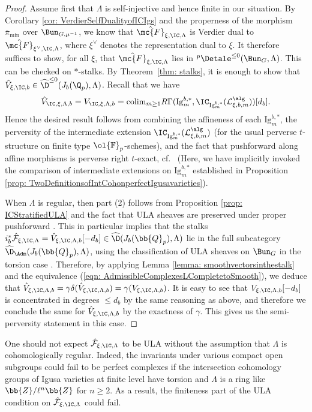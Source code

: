 \documentclass[letterpaper,11pt]{amsart}
\begin{document}
\begin{proof}
Assume first that $\Lambda$ is self-injective and hence finite in our situation. By Corollary \ref{cor: VerdierSelfDualityofICIgs} and the properness of the morphism $\overline{\pi}_{\min}$ over $\Bun_{G,\mu^{-1}}$, we know that $\hat{\mc{F}}_{\xi,\IC,\Lambda}$ is Verdier dual to $\hat{\mc{F}}_{\xi^{\vee},\IC,\Lambda}$, where $\xi^{\vee}$ denotes the representation dual to $\xi$.  It therefore suffices to show, for all $\xi$, that $\hat{\mc{F}}_{\xi,\IC,\Lambda}$ lies in ${}^p\Detale^{\leq 0}(\Bun_G,\Lambda)$. This can be checked on $*$-stalks. By Theorem~\ref{thm: stalks}, it is enough to show that $\hat{V}_{\xi,\IC,b}\in \widehat{\D}^{\leq 0}(J_b(\Q_p),\Lambda)$. Recall that we have
\[
\hat{V}_{\IC,\xi,\Lambda,b} = V_{\IC,\xi,\Lambda,b} = \mathrm{colim}_{m\geq 1} R\Gamma(\mathrm{Ig}^{b,*}_m, \IC_{\mathrm{Ig}^{b,*}_m}(\mathcal{L}_{\xi,b,m}^{\alg}))[d_b].
\]
Hence the desired result follows from combining the affineness of each $\mathrm{Ig}^{b,\ast}_m$, the perversity of the intermediate extension $\IC_{\mathrm{Ig}^{b,\ast}_m}(\mathcal{L}_{\xi,b,m}^{\alg})$ (for the usual perverse $t$-structure on finite type $\ol{\mathbb{F}}_p$-schemes), and the fact that pushforward along affine morphisms is perverse right $t$-exact, cf.~\cite[Theorem 4.1.1]{BBD} (Here, we have implicitly invoked the comparison of intermediate extensions on $\mathrm{Ig}^{b,*}_m$ established in Proposition \ref{prop: TwoDefinitionsofIntCohonperfectIgusavarieties}).

When $\Lambda$ is regular, then part (2) follows from Proposition \ref{prop: ICStratifiedULA} and the fact that ULA sheaves are preserved under proper pushforward \cite[Proposition~IV.2.11]{FSGeomLLC}. This in particular implies that the stalks $i_{b}^{*}\hat{\mathcal{F}}_{\xi,\IC,\Lambda} = \hat{V}_{\xi,\IC,\Lambda,b}[-d_{b}] \in \widehat{\D}(J_{b}(\bb{Q}_{p}),\Lambda)$ lie in the full subcategory $\widehat{\D}_{\Adm}(J_{b}(\bb{Q}_{p}),\Lambda)$, using the classification of ULA sheaves on $\Bun_{G}$ in the torsion case \cite[Theorem~V.7.1.]{FSGeomLLC}. Therefore, by applying Lemma \ref{lemma: smoothvectorsinthestalk} and the equivalence (\ref{eqn: AdmissibleComplexesLCompletetoSmooth}), we deduce that $\hat{V}_{\xi,\IC,\Lambda,b} = \gamma\delta(\hat{V}_{\xi,\IC,\Lambda,b}) = \gamma(V_{\xi,\IC,\Lambda,b})$. It is easy to see that $V_{\xi,\IC,\Lambda,b}[-d_{b}]$ is concentrated in degrees $\leq d_{b}$ by the same reasoning as above, and therefore we conclude the same for $\hat{V}_{\xi,\IC,\Lambda,b}$ by the exactness of $\gamma$. This gives us the semi-perversity statement in this case.
\end{proof}
\begin{remark}
One should not expect $\hat{\mathcal{F}}_{\xi,\IC,\Lambda}$ to be ULA without the assumption that $\Lambda$ is cohomologically regular. Indeed, the invariants under various compact open subgroups could fail to be perfect complexes if the intersection cohomology groups of Igusa varieties at finite level have torsion and $\Lambda$ is a ring like $\bb{Z}/\ell^{n}\bb{Z}$ for $n \geq 2$. As a result, the finiteness part of the ULA condition on $\hat{\mathcal{F}}_{\xi,\IC,\Lambda}$ could fail. 
\end{remark}
\end{document}
